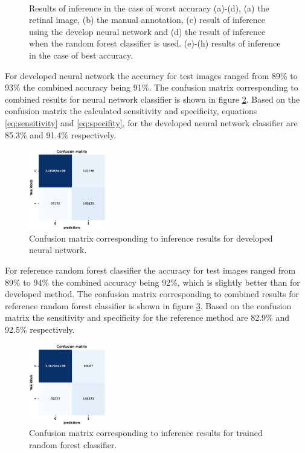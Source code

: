 \documentclass[aps,prb,10pt,twocolumn,groupedaddress]{revtex4-1}
\begin{document}
\begin{figure}[!t]
\begin{subfigure}[]{0.22\textwidth}
		\caption{}
	\end{subfigure}\\
	\caption{Results of inference in the case of worst accuracy (a)-(d), (a) the retinal image, (b) the manual annotation, (c) result of inference using the develop neural network and (d) the result of inference when the random forest classifier is used. (e)-(h) results of inference in the case of best accuracy.}
	\label{fig:result_images}
\end{figure}

For developed neural network the accuracy for test images ranged from 89\% to 93\% the combined accuracy being 91\%. The confusion matrix corresponding to combined results for neural network classifier is shown in figure \ref{fig:confusion_matrix_nn}. Based on the confusion matrix the calculated sensitivity and specificity, equations \ref{eq:sensitivity} and \ref{eq:specifity}, for the developed neural network classifier are 85.3\% and 91.4\% respectively. 
\begin{figure}[!b]
	\centering
	\includegraphics[width=0.3\textwidth]{images/confusion_matrix_nn_total_accuracy_91.eps}
	\caption{Confusion matrix corresponding to inference results for developed neural network.}
	\label{fig:confusion_matrix_nn}
\end{figure}

For reference random forest classifier the accuracy for test images ranged from 89\% to 94\% the combined accuracy being 92\%,  which is slightly better than for developed method. The confusion matrix corresponding to combined results for reference random forest classifier is shown in figure \ref{fig:confusion_matrix_rf}. Based on the confusion matrix the sensitivity and specificity for the reference method are 82.9\% and 92.5\% respectively.
\begin{figure}[]
	\centering
	\includegraphics[width=0.3\textwidth]{images/confusion_matrix_rf_total_accuracy_92.eps}
	\caption{Confusion matrix corresponding to inference results for trained random forest classifier.}
	\label{fig:confusion_matrix_rf}
\end{figure}
\end{document}
